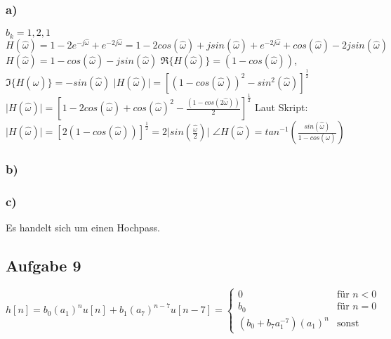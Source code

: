 \documentclass[12pt]{scrreprt}
\begin{document}
\subsubsection*{a)}
$b_k={1, 2, 1}$\newline
$H(\hat{\omega})=1-2e^{-j\hat{\omega}}+e^{-2j\hat{\omega}}=1-2cos(\hat{\omega})+ 
j sin(\hat{\omega}) + e^{-2j\hat{\omega}} + cos(\hat{\omega}) - 2j sin(\hat{\omega})$\newline
$H(\hat{\omega})=1 - cos(\hat{\omega}) - j sin(\hat{\omega})$\newline
$\Re\{H(\hat{\omega})\}=(1 - cos(\hat{\omega}))$, $\Im\{H(\hat{\omega})\}=-sin(\hat{\omega})$\newline
$\vert H(\hat{\omega}) \vert = \left[(1-cos(\hat{\omega}))^2 - sin^2(\hat{\omega})\right]^{\frac{1}{2}}$\newline
$\vert H(\hat{\omega}) \vert = \left[1-2cos(\hat{\omega}) + cos(\hat{\omega})^2 - \frac{(1-cos(2\hat{\omega}))}{2}\right]^{\frac{1}{2}}$\newline
Laut Skript:\newline
$\vert H(\hat{\omega}) \vert = \left[ 2 (1-cos(\hat{\omega}))\right]^\frac{1}{2} = 2 \vert sin(\frac{\hat{\omega}}{2})\vert$\newline
$\angle H(\hat{\omega}) = tan^{-1}\left(\frac{sin(\hat{\omega})}{1-cos(\hat{\omega})}\right)$\newline
\newline

\subsubsection*{b)}
\subsubsection*{c)}
Es handelt sich um einen Hochpass.\newline

\subsection*{Aufgabe 9}
$h[n]=b_0(a_1)^n u[n] + b_1(a_7)^{n-7} u[n-7]=
\begin{cases}
0							& \text{für } n<0\\
b_0 						& \text{für } n=0\\
(b_0 + b_7 a_1^{-7})(a_1)^n	& \text{sonst}
\end{cases}
$\newline
{}
\end{document}
